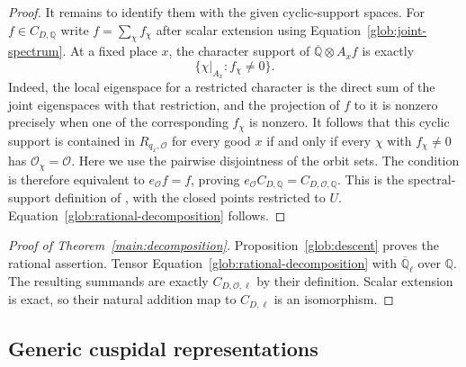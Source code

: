 \begin{proof}
It remains to identify them with the given cyclic-support spaces.
For $f\in C_{D,\mathbb Q}$ write $f=\sum_\chi f_\chi$ after scalar
extension using Equation~\eqref{glob:joint-spectrum}.
At a fixed place $x$, the character support of
$\overline{\mathbb Q}\otimes A_x f$ is exactly
\[
         \{\chi|_{A_x}:f_\chi\ne0\}.
\]
Indeed, the local eigenspace for a restricted character is the
direct sum of the joint eigenspaces with that restriction, and the
projection of $f$ to it is nonzero precisely when one of the
corresponding $f_\chi$ is nonzero.  It follows that this cyclic
support is contained in $R_{q_x,\mathcal O}$ for every good $x$ if
and only if every $\chi$ with $f_\chi\ne0$ has
$\mathcal O_\chi=\mathcal O$.  Here we use the pairwise
disjointness of the orbit sets.  The condition is therefore
equivalent to $e_{\mathcal O}f=f$, proving
$e_{\mathcal O}C_{D,\mathbb Q}=C_{D,\mathcal O,\mathbb Q}$.
This is the spectral-support definition of
\cite[Section~3.4.3]{GLR}, with the closed points restricted to $U$.
Equation~\eqref{glob:rational-decomposition} follows.
\end{proof}

\begin{proof}[Proof of Theorem~\ref{main:decomposition}]
Proposition~\ref{glob:descent} proves the rational assertion.
Tensor Equation~\eqref{glob:rational-decomposition} with
$\overline{\mathbb Q}_\ell$ over $\mathbb Q$.  The resulting
summands are exactly $C_{D,\mathcal O,\ell}$ by their definition.
Scalar extension is exact, so their natural addition map to
$C_{D,\ell}$ is an isomorphism.
\end{proof}

\subsection{Generic cuspidal representations}

